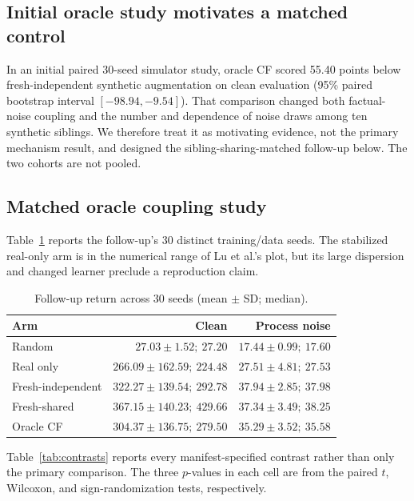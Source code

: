 \documentclass[runningheads]{llncs}
\begin{document}
\subsection{Initial oracle study motivates a matched control}

In an initial paired 30-seed simulator study, oracle CF scored 55.40 points
below fresh-independent synthetic augmentation on clean evaluation (95\% paired
bootstrap interval $[-98.94,-9.54]$). That comparison changed both factual-noise
coupling and the number and dependence of noise draws among ten synthetic
siblings. We therefore treat it as motivating evidence, not the primary
mechanism result, and designed the sibling-sharing-matched follow-up below. The two
cohorts are not pooled.

\subsection{Matched oracle coupling study}

Table~\ref{tab:arms} reports the follow-up's 30 distinct training/data seeds.
The stabilized real-only arm is in the numerical range of Lu et al.'s plot, but
its large dispersion and changed learner preclude a reproduction claim.

\begin{table}[H]
\centering
\caption{Follow-up return across 30 seeds (mean $\pm$ SD; median).}
\label{tab:arms}
\small
\begin{tabular}{@{}lrr@{}}
\toprule
Arm & Clean & Process noise \\
\midrule
Random & $27.03\pm1.52;\ 27.20$ & $17.44\pm0.99;\ 17.60$ \\
Real only & $266.09\pm162.59;\ 224.48$ & $27.51\pm4.81;\ 27.53$ \\
Fresh-independent & $322.27\pm139.54;\ 292.78$ & $37.94\pm2.85;\ 37.98$ \\
Fresh-shared & $367.15\pm140.23;\ 429.66$ & $37.34\pm3.49;\ 38.25$ \\
Oracle CF & $304.37\pm136.75;\ 279.50$ & $35.29\pm3.52;\ 35.58$ \\
\bottomrule
\end{tabular}
\end{table}

Table~\ref{tab:contrasts} reports every manifest-specified contrast rather than
only the primary comparison. The three $p$-values in each cell are from the
paired $t$, Wilcoxon, and sign-randomization tests, respectively.
\end{document}
